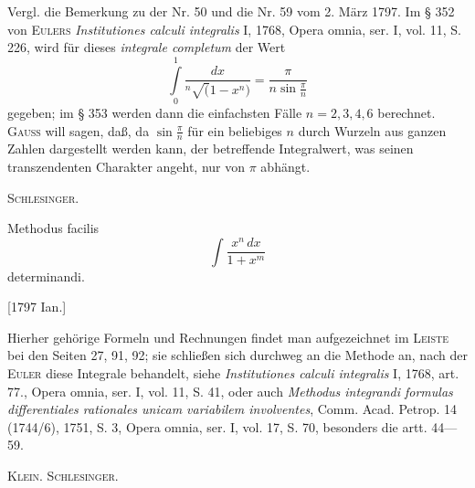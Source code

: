 \medskip\begingroup\small
\indent Vergl. die Bemerkung zu der Nr. 50 und die Nr. 59 vom 2. März 1797. Im § 352 von \textsc{Eulers} \textit{Institutiones calculi integralis} I, 1768, Opera omnia, ser. I, vol. 11, S. 226, wird für dieses \textit{integrale completum} der Wert
\[
\int\limits_0^1\frac{dx}{{}^{n}\!\surd(1-x^n)}=\frac\pi{n\sin\frac\pi n}
\]
\noindent gegeben; im § 353 werden dann die einfachsten Fälle \(n=2,3,4,6\) berechnet. \textsc{Gauss} will sagen, daß, da \(\sin\frac\pi n\) für ein beliebiges \(n\) durch Wurzeln aus ganzen Zahlen dargestellt werden kann, der betreffende Integralwert, was seinen transzendenten Charakter angeht, nur von \(\pi\) abhängt.
\par\noindent\hfill\textsc{Schlesinger.}
\par\endgroup

\indent Methodus facilis
\[
\int\frac{x^n\,dx}{1+x^m}
\]
\noindent determinandi.
\par\noindent\hfill[1797 Ian.]

\medskip\begingroup\small
\indent Hierher gehörige Formeln und Rechnungen findet man aufgezeichnet im \textsc{Leiste} bei den Seiten 27, 91, 92; sie schließen sich durchweg an die Methode an, nach der \textsc{Euler} diese Integrale behandelt, siehe \textit{Institutiones calculi integralis} I, 1768, art. 77., Opera omnia, ser. I, vol. 11, S. 41, oder auch \textit{Methodus integrandi formulas differentiales rationales unicam variabilem involventes}, Comm. Acad. Petrop. 14 (1744/6), 1751, S. 3, Opera omnia, ser. I, vol. 17, S. 70, besonders die artt. 44—59.
\par\noindent\hfill\textsc{Klein. Schlesinger.}
\par\endgroup
